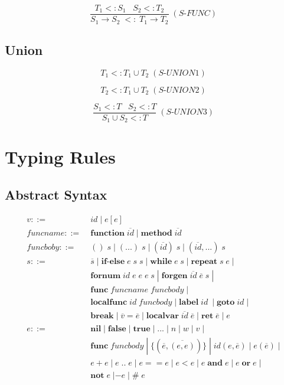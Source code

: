 \documentclass[12pt]{article}
\begin{document}
\[
\frac{T_{1} <: S_{1} \;\;\; S_{2} <: T_{2}}
     {S_{1} \rightarrow S_{2} \; <: \; T_{1} \rightarrow T_{2}} \;
(\textit{S-FUNC})
\]

\subsection{Union}

\[
T_{1} <: T_{1} \cup T_{2} \; (\textit{S-UNION1})
\]

\[
T_{2} <: T_{1} \cup T_{2} \; (\textit{S-UNION2})
\]

\[
\frac{S_{1} <: T\;\;\; S_{2} <: T}
     {S_{1} \cup S_{2} <: T} \; (\textit{S-UNION3})
\]

%

\section{Typing Rules}

\subsection{Abstract Syntax}

\begin{align*}
v ::= \; & id \; | \; e[e]\\
funcname ::= \; & \textbf{function} \; \overline{id} \;
| \; \textbf{method} \; \overline{id}\\
funcboby ::= \; & () \; s \; | \; ({...}) \; s \;
| \; (\overline{id}) \; s \; | \; (\overline{id},{...}) \; s\\
s ::= \; & \overline{s} \;
| \; \textbf{if-else} \; e \; s \; s \;
| \; \textbf{while} \; e \; s \;
| \; \textbf{repeat} \; s \; e \; | \\
& \textbf{fornum} \; id \; e \; e \; e \; s \; 
| \; \textbf{forgen} \; \overline{id} \; \overline{e} \; s \; | \\
& \textbf{func} \; funcname \; funcbody \; | \\
& \textbf{localfunc} \; id \; funcbody \;
| \; \textbf{label} \; id\ \; | \; \textbf{goto} \; id \; | \\
& \textbf{break} \;
| \; \overline{v} = \overline{e} \;
| \; \textbf{localvar} \; \overline{id} \; \overline{e} \;
| \; \textbf{ret} \; \overline{e} \; | \; e\\
e ::= \; & \textbf{nil} \; | \; \textbf{false} \; | \; \textbf{true} \;
| \; {...} \; | \; n \; | \; w \; | \; v \; | \\
& \textbf{func} \; funcbody \;
| \; \{(\overline{e},\overline{(e,e)})\} \;
| \; id(e,\overline{e}) \; | \; e(\overline{e}) \; | \\
& e + e \; | \; e \; {..} \; e \; | \; e == e \; | \; e < e \;
| \; e \; \textbf{and} \; e \; | \; e \; \textbf{or} \; e \; | \\
& \textbf{not} \; e \; | - e \; | \; \# \; e
\end{align*}
\end{document}
